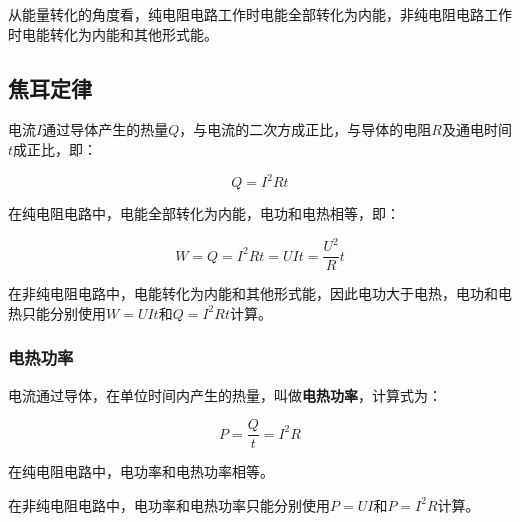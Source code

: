 从能量转化的角度看，纯电阻电路工作时电能全部转化为内能，非纯电阻电路工作时电能转化为内能和其他形式能。

\subsection{焦耳定律}

电流$I$通过导体产生的热量$Q$，与电流的二次方成正比，与导体的电阻$R$及通电时间$t$成正比，即：

\begin{equation}
Q=I^2Rt
\end{equation}

在纯电阻电路中，电能全部转化为内能，电功和电热相等，即：

\begin{equation}
W=Q=I^2Rt=UIt=\frac{U^2}{R}t
\end{equation}

在非纯电阻电路中，电能转化为内能和其他形式能，因此电功大于电热，电功和电热只能分别使用$W=UIt$和$Q=I^2Rt$计算。

\subsubsection{电热功率}

电流通过导体，在单位时间内产生的热量，叫做\textbf{电热功率}，计算式为：

\begin{equation}
P=\frac{Q}{t}=I^2R
\end{equation}

在纯电阻电路中，电功率和电热功率相等。

在非纯电阻电路中，电功率和电热功率只能分别使用$P=UI$和$P=I^2R$计算。
